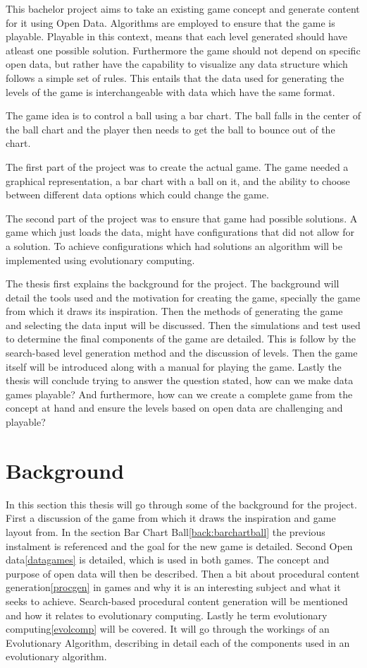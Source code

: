 \documentclass[a4paper,11pt]{article}
\begin{document}
This bachelor project aims to take an existing game concept and generate content for it using Open Data. Algorithms are employed to ensure that the game is playable. Playable in this context, means that each level generated should have atleast one possible solution. Furthermore the game should not depend on specific open data, but rather have the capability to visualize any data structure which follows a simple set of rules. This entails that the data used for generating the levels of the game is interchangeable with data which have the same format.

The game idea is to control a ball using a bar chart. The ball falls in the center of the ball chart and the player then needs to get the ball to bounce out of the chart. 

The first part of the project was to create the actual game. The game needed a graphical representation, a bar chart with a ball on it, and the ability to choose between different data options which could change the game. 

The second part of the project was to ensure that game had possible solutions. A game which just loads the data, might have configurations that did not allow for a solution. To achieve configurations which had solutions an algorithm will be implemented using evolutionary computing.

The thesis first explains the background for the project. The background will detail the tools used and the motivation for creating the game, specially the game from which it draws its inspiration. Then the methods of generating the game and selecting the data input will be discussed. Then the simulations and test used to determine the final components of the game are detailed. This is follow by the search-based level generation method and the discussion of levels. Then the game itself will be introduced along with a manual for playing the game. Lastly the thesis will conclude trying to answer the question stated, how can we make data games playable? And furthermore, how can we create a complete game from the concept at hand and ensure the levels based on open data are challenging and playable?
\pagebreak
\section{Background}
In this section this thesis will go through some of the background for the project. First a discussion of the game from which it draws the inspiration and game layout from. In the section Bar Chart Ball\ref{back:barchartball} the previous instalment is referenced and the goal for the new game is detailed. Second Open data\ref{datagames} is detailed, which is used in both games. The concept and purpose of open data will then be described. Then a bit about procedural content generation\ref{procgen} in games and why it is an interesting subject and what it seeks to achieve. Search-based procedural content generation will be mentioned and how it relates to evolutionary computing. Lastly he term evolutionary computing\ref{evolcomp} will be covered. It will go through the workings of an Evolutionary Algorithm, describing in detail each of the components used in an evolutionary algorithm.
\end{document}
